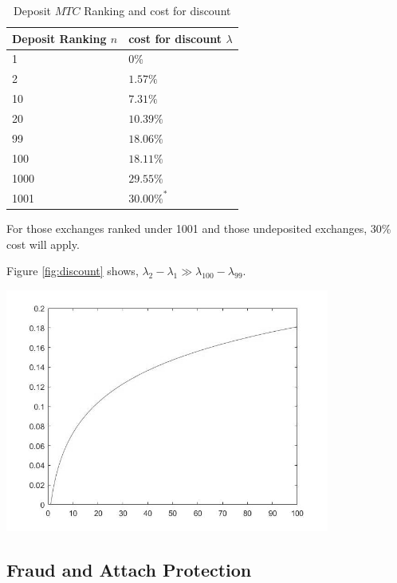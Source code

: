 \documentclass[UTF8,nofonts]{article}
\makeatletter
\newenvironment{figurehere}
 {\def\@captype{figure}}
 {}
\makeatother
\begin{document}
\begin{table}[hbt]
 \centering
\begin{tabular}{p{3.5cm}|p{3cm}} %
Deposit Ranking $n$ & cost for discount $\lambda$ \\ %
  \hline
1 & 0\%\\
\hline
2 & $1.57\%$\\
\hline
10 & $7.31\%$\\
\hline
20 & $10.39\%$\\
\hline
99 &$18.06\%$\\
\hline
100 &$18.11\%$\\
\hline
1000 &$29.55\%$\\
\hline
1001 &$30.00\%^*$\\
 \end{tabular}
\caption{Deposit $MTC$ Ranking and cost for discount} %
\end{table}


For those exchanges ranked under 1001 and those undeposited exchanges, 30\% cost will apply.

Figure \ref{fig:discount} shows, $\lambda_{2} - \lambda_{1} \gg \lambda_{100} - \lambda_{99}$.

\begin{center}
\begin{figurehere}
\includegraphics[height=8cm]{images/exchange-discount.png}

\caption{$MTC$ token deposit rank and cost for discount}
\label{fig:discount}

\end{figurehere}
\end{center}


\subsection{Fraud and Attach Protection}
\end{document}
